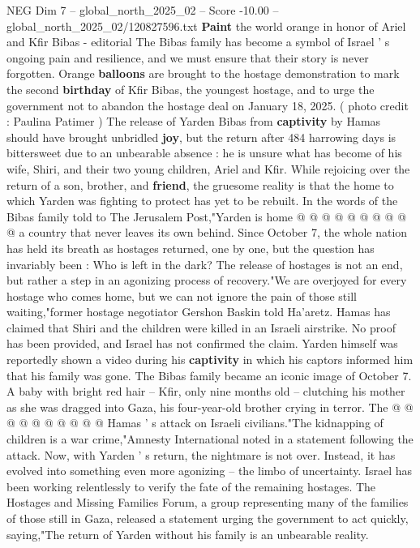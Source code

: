 \begin{textsample}{NEG Dim 7 – global\_north\_2025\_02 – Score -10.00 – global\_north\_2025\_02/120827596.txt}  \label{ex:f7_neg_067}
\textbf{Paint} the world orange in honor of Ariel and Kfir Bibas - editorial The Bibas family has become a symbol of Israel ' s ongoing pain and resilience, and we must ensure that their story is never forgotten.
Orange \textbf{balloons} are brought to the hostage demonstration to mark the second \textbf{birthday} of Kfir Bibas, the youngest hostage, and to urge the government not to abandon the hostage deal on January 18, 2025. ( photo credit : Paulina Patimer ) The release of Yarden Bibas from \textbf{captivity} by Hamas should have brought unbridled \textbf{joy}, but the return after 484 harrowing days is bittersweet due to an unbearable absence : he is unsure what has become of his wife, Shiri, and their two young children, Ariel and Kfir.
While rejoicing over the return of a son, brother, and \textbf{friend}, the gruesome reality is that the home to which Yarden was fighting to protect has yet to be rebuilt.
In the words of the Bibas family told to The Jerusalem Post,"Yarden is home @ @ @ @ @ @ @ @ @ @ a country that never leaves its own behind.
Since October 7, the whole nation has held its breath as hostages returned, one by one, but the question has invariably been : Who is left in the dark?
The release of hostages is not an end, but rather a step in an agonizing process of recovery."We are overjoyed for every hostage who comes home, but we can not ignore the pain of those still waiting,"former hostage negotiator Gershon Baskin told Ha'aretz.
Hamas has claimed that Shiri and the children were killed in an Israeli airstrike.
No proof has been provided, and Israel has not confirmed the claim.
Yarden himself was reportedly shown a video during his \textbf{captivity} in which his captors informed him that his family was gone.
The Bibas family became an iconic image of October 7.
A baby with bright red hair -- Kfir, only nine months old -- clutching his mother as she was dragged into Gaza, his four-year-old brother crying in terror.
The @ @ @ @ @ @ @ @ @ @ Hamas ' s attack on Israeli civilians."The kidnapping of children is a war crime,"Amnesty International noted in a statement following the attack.
Now, with Yarden ' s return, the nightmare is not over.
Instead, it has evolved into something even more agonizing -- the limbo of uncertainty.
Israel has been working relentlessly to verify the fate of the remaining hostages.
The Hostages and Missing Families Forum, a group representing many of the families of those still in Gaza, released a statement urging the government to act quickly, saying,"The return of Yarden without his family is an unbearable reality.

\end{textsample}
